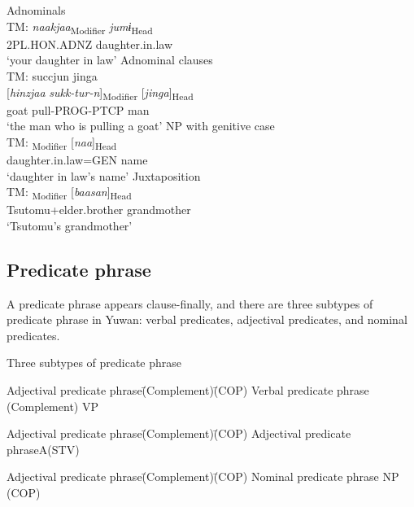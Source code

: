 \ea\label{ex:4.3} 
\ea Adnominals\hfill\relax[Co: 110328\_00.txt]\\
   {TM:} \gll \ob\textit{naakjaa}\cb\textsubscript{Modifier}   \ob\textit{jumɨ}\cb\textsubscript{Head}\\
               2PL.HON.ADNZ  daughter.in.law\\
 \glt{} ‘your daughter in law’
\ex Adnominal clauses\hfill\relax[PF: 090222\_00.txt]\\
   {TM:}    succjun  {jinga}\\
     {[\textit{hinzjaa}}   \textit{sukk-tur-n}]\textsubscript{Modifier}  [\textit{jinga}]\textsubscript{Head}\\
     {goat}   pull-PROG-PTCP  {man}\\
      \glt{} ‘the man who is pulling a goat’
\ex NP with genitive case\hfill\relax[Co: 110328\_00.txt]\\
   {TM:} \gll  [\textit{jumɨ=nu}]\textsubscript{Modifier}   [\textit{naa}]\textsubscript{Head}\\
      daughter.in.law=GEN   name\\
    \glt \glt{} ‘daughter in law’s name’
\ex Juxtaposition\hfill\relax[Co: 120415\_00.txt]\\
   {TM:}  \textsubscript{Modifier}   [\textit{baasan}]\textsubscript{Head}\\
      Tsutomu+elder.brother  grandmother\\
      \glt{} ‘Tsutomu’s grandmother’
\z
\z


\subsection{Predicate phrase}
\label{bkm:Ref306571554}\hypertarget{RefHeadingToc395696994}{}
A predicate phrase appears clause-finally, and there are three subtypes of predicate phrase in Yuwan: verbal predicates, adjectival predicates, and nominal predicates.

\ea Three subtypes of predicate phrase\\
\ea 
\begin{tabbing}
Adjectival predicate phrase\hspace{1em}\= (Complement)\hspace{1em}\= (COP)\kill
Verbal predicate phrase     \> (Complement) \>  VP
\end{tabbing}
\ex 
\begin{tabbing}
Adjectival predicate phrase\hspace{1em}\= (Complement)\hspace{1em}\= (COP)\kill
Adjectival predicate phrase\>A\>(STV)
\end{tabbing}
\ex 
\begin{tabbing}
Adjectival predicate phrase\hspace{1em}\= (Complement)\hspace{1em}\= (COP)\kill
Nominal predicate phrase    \>  NP          \> (COP)
\end{tabbing}
\z

